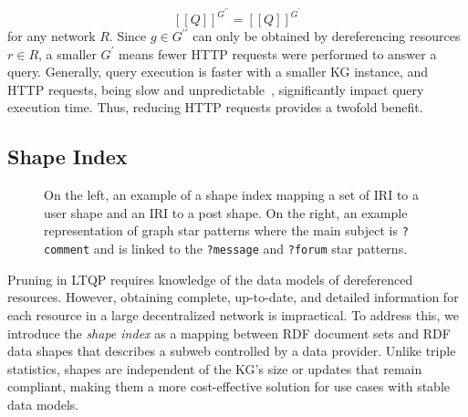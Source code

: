 \begin{equation}\label{eq:evalQueryStructuralAssumption}
   [\![ Q ]\!]^{G^{\prime\prime}} = [\![ Q ]\!]^{G^{\prime}}
\end{equation}
for any network $R$.
Since $g \in G^{\prime\prime}$ can only be obtained by dereferencing resources $r \in R$, a smaller $G^\prime$ means fewer HTTP requests were performed to answer a query.  
Generally, query execution is faster with a smaller KG instance, and HTTP requests, being slow and unpredictable~\cite{hartig2016walking}, significantly impact query execution time.  
Thus, reducing HTTP requests provides a twofold benefit.

\subsection{Shape Index}

\begin{figure}
   \centering
   \begin{minipage}[t]{0.55\linewidth}
      \centering
      
   \end{minipage}
   \begin{minipage}[t]{0.40\linewidth}
      \centering
      
   \end{minipage}

   \caption{
      On the left, an example of a shape index mapping a set of IRI to a user shape and an IRI to a post shape.
      On the right, an example representation of graph star patterns where the main subject is \texttt{?comment} and is linked to the \texttt{?message} and \texttt{?forum} star patterns.}
   \label{fig:shapeIndex}
\end{figure}

Pruning in LTQP requires knowledge of the data models of dereferenced resources.  
However, obtaining complete, up-to-date, and detailed information for each resource in a large decentralized network is impractical.  
To address this, we introduce the \emph{shape index} as a mapping between RDF document sets and RDF data shapes that describes a subweb controlled by a data provider.  
Unlike triple statistics, shapes are independent of the KG's size or updates that remain compliant, making them a more cost-effective solution for use cases with stable data models. 

